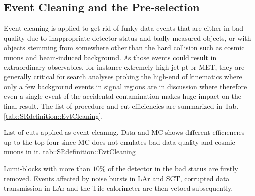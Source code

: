 \subsection{Event Cleaning and the Pre-selection} \label{sec::SRdefinition::eventCleaning}
Event cleaning is applied to get rid of funky data events that are either in bad quality due to inappropriate detector status and badly measured objects, or with objects stemming from somewhere other than the hard collision such as cosmic muons and beam-induced background. 
As those events could result in extraordinary observables, for instance extremely high jet pt or MET, they are generally critical for search analyses probing the high-end of kinematics where only a few background events in signal regions are in discussion where therefore even a single event of the accidental contamination makes huge impact on the final result. The list of procedure and cut efficiencies are summarized in Tab. \ref{tab::SRdefinition::EvtCleaning}. 

{List of cuts applied as event cleaning. Data and MC shows different efficiencies up-to the top four since MC does not emulates bad data quality and cosmic muons in it.}
{tab::SRdefinition::EvtCleaning}

Lumi-blocks with more than $10\%$ of the detector in the bad status are firstly removed. 
Events affected by noise bursts in LAr and SCT,  corrupted data transmission in LAr and the Tile calorimeter are then vetoed subsequently. 

